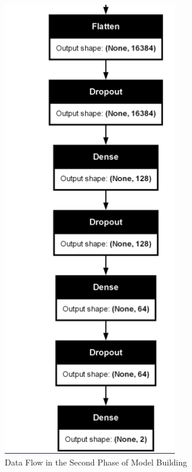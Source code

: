 \begin{figure}[htbp]
    \centering
    \includegraphics[width=3in]{img/2NDPHASE.png}
    \caption{{Data Flow in the Second Phase of Model Building}}
\end{figure}


\newpage